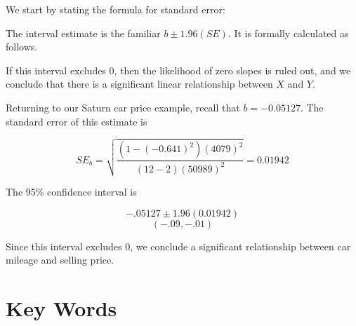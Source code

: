 \documentclass[11pt, chapterprefix=true]{scrbook}\usepackage[]{graphicx}\usepackage[]{color}
\begin{document}
We start by stating the formula for standard error:


The interval estimate is the familiar $b \pm 1.96(SE)$.  It is formally calculated as follows.


If this interval excludes 0, then the likelihood of zero slopes is ruled out, and we conclude that there is a significant linear relationship between $X$ and $Y$.

Returning to our Saturn car price example, recall that $b = -0.05127$.  The standard error of this estimate is

\begin{equation*}
  SE_b = \sqrt{ \frac{(1 - (-0.641)^2) (4079)^2}{(12 - 2) (50989)^2}} = 0.01942 
\end{equation*}  

The 95\% confidence interval is 

\begin{equation*}
  -.05127 \pm 1.96 (0.01942) 
\end{equation*}  
\begin{equation*}
  (-.09,  -.01) 
\end{equation*}

Since this interval excludes 0, we conclude a significant relationship between car mileage and selling price.

\section{Key Words}
\end{document}
